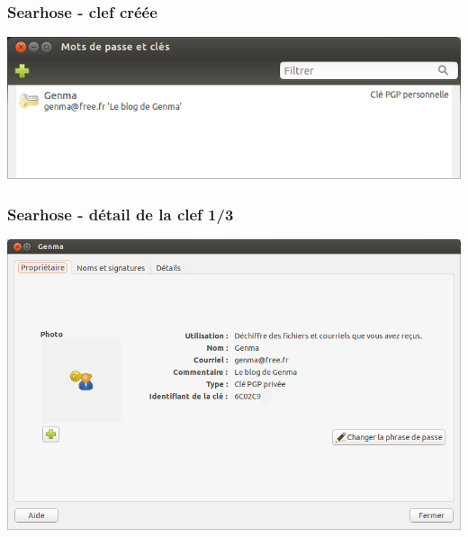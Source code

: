 \documentclass{beamer}
\begin{document}
\begin{frame}
\frametitle{Searhose - clef créée}
\begin{center}
\includegraphics[scale=0.4] {./images/Seahorse06_creationclef.png}
\end{center}
\begin{itemize}
\end{itemize}
\end{frame}

\begin{frame}
\frametitle{Searhose - détail de la clef 1/3}
\begin{center}
\includegraphics[scale=0.3] {./images/Seahorse07_creationclef.png}
\end{center}
\end{frame}
\end{document}
